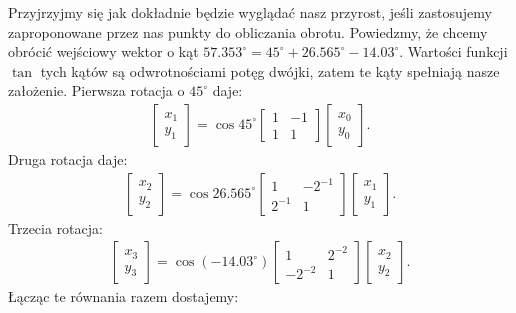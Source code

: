 \documentclass{mwart}
\theoremstyle{remark}
\theoremstyle{definition}
\theoremstyle{definition}
\begin{document}
Przyjrzyjmy się jak dokładnie będzie wyglądać nasz przyrost, jeśli zastosujemy zaproponowane przez nas punkty do obliczania obrotu. Powiedzmy, że chcemy obrócić wejściowy wektor o kąt $57.353^{\circ} = 45^{\circ} + 26.565^{\circ} - 14.03^{\circ}$. Wartości funkcji $\tan$ tych kątów są odwrotnościami potęg dwójki, zatem te kąty spełniają nasze założenie. Pierwsza rotacja o $45^{\circ}$ daje:
\begin{align}
  \begin{bmatrix}
    x_1 \\ y_1
  \end{bmatrix}
  = \cos 45^{\circ}
  \begin{bmatrix}
    1 & -1 \\
    1 & 1
  \end{bmatrix}
  \begin{bmatrix}
    x_0 \\ y_0
  \end{bmatrix}.
\end{align}
Druga rotacja daje:
\begin{align}
  \begin{bmatrix}
    x_2 \\ y_2
  \end{bmatrix}
  = \cos 26.565^{\circ}
  \begin{bmatrix}
    1      & -2^{-1} \\
    2^{-1} & 1
  \end{bmatrix}
  \begin{bmatrix}
    x_1 \\ y_1
  \end{bmatrix}.
\end{align}
Trzecia rotacja:
\begin{align}
  \begin{bmatrix}
    x_3 \\ y_3
  \end{bmatrix}
  = \cos(-14.03^{\circ})
  \begin{bmatrix}
    1       & 2^{-2} \\
    -2^{-2} & 1
  \end{bmatrix}
  \begin{bmatrix}
    x_2 \\ y_2
  \end{bmatrix}.
\end{align}
Łącząc te równania razem dostajemy:
\end{document}
